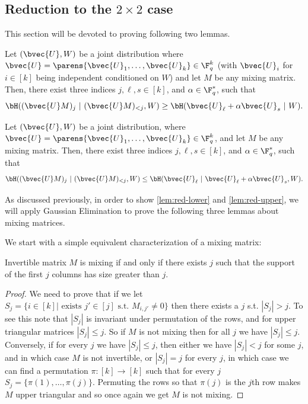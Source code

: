 \documentclass[11pt]{article}
\begin{document}
\subsection{Reduction to the $2\times 2$ case} 
\label{sec:reduction}


This section will be devoted to proving following two lemmas.

\begin{lemma}
	\label{lem:red-upper}
	Let $(\bvec{U}, W)$ be a joint distribution where $\bvec{U}=\parens{\bvec{U}_1,\dots,\bvec{U}_k} \in \F_q^{k}$ (with $\bvec{U}_i$ for $i\in [k]$ being independent conditioned on $W$)
	and
	let $M$ be any mixing matrix.
	Then, there exist three indices $j, \ell, s \in [k]$, and $\alpha \in \F_q^*$, such that
	$$\bH((\bvec{U} M)_{j} ~|~ (\bvec{U}M)_{< j}, W) \geq \bH(\bvec{U}_\ell + \alpha \bvec{U}_s ~|~ W).$$
\end{lemma}

\begin{lemma}
	\label{lem:red-lower}
	Let $(\bvec{U}, W)$ be a joint distribution, where $\bvec{U}=\parens{\bvec{U}_1,\dots,\bvec{U}_k} \in \F_q^k$, and let $M$ be any mixing matrix.
	Then, there exist three indices $j, \ell,s \in [k]$, and $\alpha \in \F_q^*$, such that
	$$\bH((\bvec{U} M)_j ~|~ (\bvec{U}M)_{< j}, W) \leq \bH(\bvec{U}_\ell ~|~ \bvec{U}_\ell + \alpha \bvec{U}_s , W).$$
\end{lemma}

As discussed previously, in order to show \cref{lem:red-lower} and \cref{lem:red-upper}, we will apply Gaussian Elimination to prove the following three lemmas about mixing matrices.

We start with a simple equivalent characterization of a mixing matrix: 
\begin{lemma}
	\label{lem:mixing-equiv}
	Invertible matrix $M$ is mixing if and only if there exists $j$ such that the support of the first $j$ columns has size greater than $j$.
\end{lemma}
\begin{proof}
	We need to prove that if we let $S_j = \{i \in [k] | \text{ exists } j' \in [j] \mbox{ s.t. } M_{i,j'}\ne 0\}$ then there exists a $j$ s.t. $|S_j| > j$. To see this note that $|S_j|$ is invariant under permutation of the rows, and for upper triangular matrices $|S_j|\leq j$. So if $M$ is not mixing then for all $j$ we have $|S_j| \leq j$. Conversely, if for every $j$ we have $|S_j|\leq j$, then either we have $|S_j| < j$ for some $j$, and in which case $M$ is not invertible, or $|S_j| = j$ for every $j$, in which case we can find a permutation $\pi:[k]\to [k]$ such that for every $j$ $S_j = \{\pi(1),\ldots,\pi(j)\}$. Permuting the rows so that $\pi(j)$ is the $j$th row makes $M$ upper triangular and so once again we get $M$ is not mixing.
\end{proof}
\end{document}
